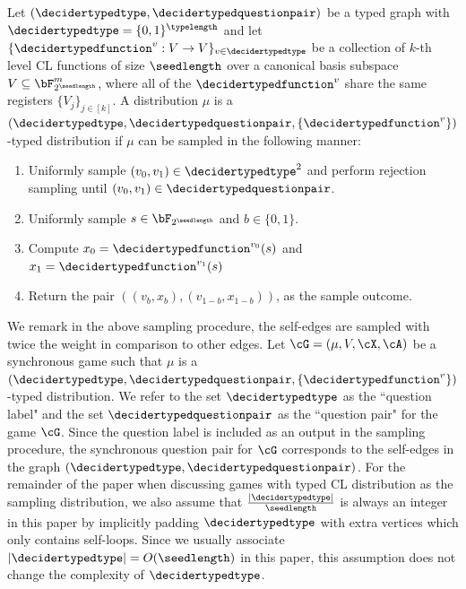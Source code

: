 \begin{definition} \label{def:typedCLsampler}
	Let $(\decidertypedtype, \decidertypedquestionpair)$ be a typed graph with $\decidertypedtype = \{0,1\}^{\typelength}$ and let $\{\decidertypedfunction^{v}: V \rightarrow V\}_{v \in \decidertypedtype}$ be a collection of $k$-th level CL functions of size $\seedlength$ over a canonical basis subspace $V \subseteq \bF_{2^{\seedlength}}^m$, where all of the $\decidertypedfunction^{v}$ share the same registers $\{V_j\}_{j \in [k]}$. A distribution $\mu$ is a $(\decidertypedtype, \decidertypedquestionpair,\{\decidertypedfunction^{v}\})$-typed distribution if $\mu$ can be sampled in the following manner:
	\begin{enumerate}
		\item Uniformly sample $(v_0, v_1) \in \decidertypedtype^2$ and perform rejection sampling until $(v_0, v_1) \in \decidertypedquestionpair$. 
		\item Uniformly sample $s \in \bF_{2^{\seedlength}}$ and $b \in \{0,1\}$. 
		\item Compute $x_0 = \decidertypedfunction^{v_0}(s)$ and $x_1 = \decidertypedfunction^{v_1}(s)$
		\item Return the pair $\left((v_b,x_b),  (v_{1-b},x_{1-b})\right)$, as the sample outcome. 
	\end{enumerate}
\end{definition}


We remark in the above sampling procedure, the self-edges are sampled with twice the weight in comparison to other edges. Let $\cG = (\mu, V, \cX, \cA)$ be a synchronous game such that $\mu$ is a $(\decidertypedtype, \decidertypedquestionpair,\{\decidertypedfunction^{v}\})$-typed distribution. We refer to the set $\decidertypedtype$ as the ``question label" and the set $\decidertypedquestionpair$ as the ``question pair" for the game $\cG$. Since the question label is included as an output in the sampling procedure, the synchronous question pair for $\cG$ corresponds to the self-edges in the graph $(\decidertypedtype, \decidertypedquestionpair)$. For the remainder of the paper when discussing games with typed CL distribution as the sampling distribution, we also assume that $\frac{|\decidertypedtype|}{\seedlength}$ is always an integer in this paper by implicitly padding $\decidertypedtype$ with extra vertices which only contains self-loops. Since we usually associate $|\decidertypedtype| = O(\seedlength)$ in this paper, this assumption does not change the complexity of $\decidertypedtype$. 

